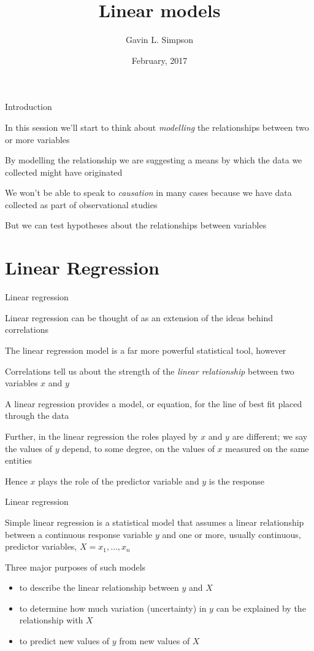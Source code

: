 \documentclass[10pt,ignorenonframetext,compress, aspectratio=169]{beamer}
\title{Linear models}
\author{Gavin L. Simpson}
\date{February, 2017}
\providecommand{\tightlist}{%
  \setlength{\itemsep}{0pt}\setlength{\parskip}{0pt}}
\begin{document}
\frame{\titlepage}

\begin{frame}{Introduction}

In this session we'll start to think about \emph{modelling} the
relationships between two or more variables

By modelling the relationship we are suggesting a means by which the
data we collected might have originated

We won't be able to speak to \emph{causation} in many cases because we
have data collected as part of observational studies

But we can test hypotheses about the relationships between variables

\end{frame}

\section{Linear Regression}\label{linear-regression}

\begin{frame}{Linear regression}

\alert{Linear regression} can be thought of as an extension of the ideas
behind \alert{correlations}

The linear regression model is a far more powerful statistical tool,
however

Correlations tell us about the strength of the \emph{linear
relationship} between two variables \(x\) and \(y\)

A linear regression provides a model, or equation, for the line of best
fit placed through the data

Further, in the linear regression the roles played by \(x\) and \(y\)
are different; we say the values of \(y\) depend, to some degree, on the
values of \(x\) measured on the same entities

Hence \(x\) plays the role of the \alert{predictor} variable and \(y\)
is the \alert{response}

\end{frame}

\begin{frame}{Linear regression}

\alert{Simple linear regression} is a statistical model that assumes a
linear relationship between a continuous response variable \(y\) and one
or more, usually continuous, predictor variables,
\(X = x_1, \ldots, x_n\)

Three major purposes of such models

\begin{itemize}
\tightlist
\item
  to describe the linear relationship between \(y\) and \(X\)
\item
  to determine how much variation (uncertainty) in \(y\) can be
  explained by the relationship with \(X\)
\item
  to predict new values of \(y\) from new values of \(X\)
\end{itemize}

\end{frame}
\end{document}
